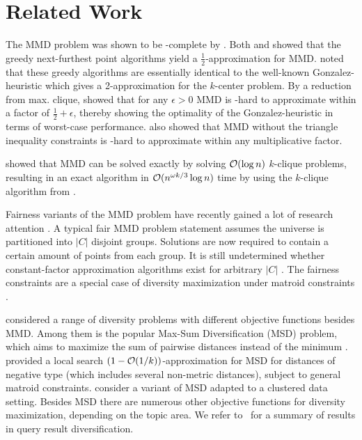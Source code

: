 \section{Related Work}
\label{sec:related}
 The MMD problem was shown to be \NP -complete by \citet{wang1988study}.
Both \citet{tamir1991obnoxious} and \citet{ravi1994heuristic} showed that the greedy next-furthest point algorithms yield a $\frac{1}{2}$-approximation for MMD. \citet{moumoulidou2020diverse} noted that these greedy algorithms are essentially identical to the well-known Gonzalez-heuristic \cite{gonzalez1985clustering} which gives a 2-approximation for the $k$-center problem. By a reduction from max. clique, \citet{ravi1994heuristic} showed that for any $\epsilon>0$ MMD is \NP -hard to approximate within a factor of $\frac{1}{2}+\epsilon$, thereby showing the optimality of the Gonzalez-heuristic in terms of worst-case performance.
\citet{ravi1994heuristic} also showed that MMD without the triangle inequality constraints is \NP -hard to approximate within any multiplicative factor.

\citet{akagi2018exact} showed that MMD can be solved exactly by solving $\mathcal{O}(\log n)$ $k$-clique problems, resulting in an exact algorithm in $\mathcal{O}(n^{\omega k/3}\log n)$ time by using the $k$-clique algorithm from \cite{nevsetvril1985complexity}.


 Fairness variants of the MMD problem have recently gained a lot of research attention \cite{Addanki0MM22,celis2018fair,wang2023max,Moumoulidou0M21,wang2022streaming,wang2023fair}.
A typical fair MMD problem statement assumes the universe is partitioned into $|C|$ disjoint groups. Solutions are now required to contain a certain amount of points from each group. It is still undetermined whether constant-factor approximation algorithms exist for arbitrary $|C|$ \cite{wang2023max,Addanki0MM22}.
The fairness constraints are a special case of diversity maximization under matroid constraints \cite{abbassi2013diversity,borodin2012max,ceccarello2020general,ceccarello2018fast,cevallos2017local}.

 \citet{CHANDRA2001438} considered a range of diversity problems with different objective functions besides MMD. Among them is the popular Max-Sum Diversification (MSD) problem, which aims to maximize the sum of pairwise distances instead of the minimum \cite{kuby1987programming,abbassi2013diversity,aghamolaei2015diversity,bauckhage2020adiabatic,
borassi2019better, indyk2014composable, hassin1997approximation,bhattacharya2011consideration}. 
\citet{cevallos2017local} provided a local search $(1-\mathcal{O}(1/k))$-approximation for MSD for distances of negative type (which includes several non-metric distances), subject to general matroid constraints. \citet{zhang2020maximizing} consider a variant of MSD adapted to a clustered data setting. Besides MSD there are numerous other objective functions for diversity maximization, depending on the topic area. We refer to~\cite{zheng2017survey} for a summary of results in query result diversification.

